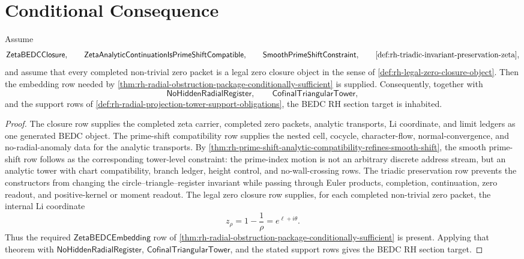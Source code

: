 \section{Conditional Consequence}
\label{sec:rh-zeta-bedc-closure-conditional-consequence}

\begin{theorem}
\label{thm:rh-strong-zeta-closure-reduces-rh-radial-package}
Assume
$$
\mathsf{ZetaBEDCClosure},
\qquad
\mathsf{ZetaAnalyticContinuationIsPrimeShiftCompatible},
\qquad
\mathsf{SmoothPrimeShiftConstraint},
\qquad
\text{\autoref{def:rh-triadic-invariant-preservation-zeta}},
$$
and assume that every completed non-trivial zero packet is a legal zero
closure object in the sense of
\autoref{def:rh-legal-zero-closure-object}. Then the embedding row
needed by
\autoref{thm:rh-radial-obstruction-package-conditionally-sufficient}
is supplied. Consequently, together with
$$
\mathsf{NoHiddenRadialRegister},
\qquad
\mathsf{CofinalTriangularTower},
$$
and the support rows of
\autoref{def:rh-radial-projection-tower-support-obligations}, the BEDC
RH section target is inhabited.
\end{theorem}

\begin{proof}
The closure row supplies the completed zeta carrier, completed zero
packets, analytic transports, Li coordinate, and limit ledgers as one
generated BEDC object. The prime-shift compatibility row supplies the
nested cell, cocycle, character-flow, normal-convergence, and
no-radial-anomaly data for the analytic transports. By
\autoref{thm:rh-prime-shift-analytic-compatibility-refines-smooth-shift},
the smooth prime-shift row follows as the corresponding tower-level
constraint: the prime-index motion is not an arbitrary discrete address
stream, but an analytic tower with chart compatibility, branch ledger,
height control, and no-wall-crossing rows. The triadic preservation row
prevents the constructors from changing the circle--triangle--register
invariant while passing through Euler products, completion,
continuation, zero readout, and positive-kernel or moment readout. The
legal zero closure row supplies, for each completed non-trivial zero
packet, the internal Li coordinate
$$
z_{\rho}=1-\frac1{\rho}=e^{\ell+i\theta}.
$$
Thus the required $\mathsf{ZetaBEDCEmbedding}$ row of
\autoref{thm:rh-radial-obstruction-package-conditionally-sufficient} is
present. Applying that theorem with
$\mathsf{NoHiddenRadialRegister}$, $\mathsf{CofinalTriangularTower}$, and
the stated support rows gives the BEDC RH section target.
\end{proof}

